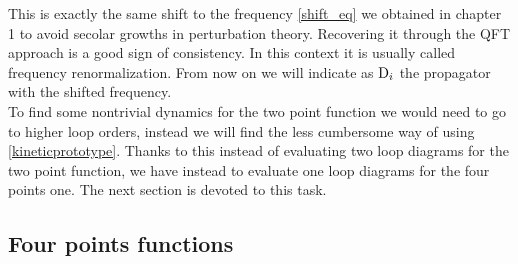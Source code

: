 This is exactly the same shift to the frequency \eqref{shift_eq} we obtained in chapter 1 to avoid secolar growths in perturbation theory.
Recovering it through the QFT approach is a good sign of consistency. In this context it is usually called frequency renormalization. From now on we will indicate
as $\mathrm{D}_i$ the propagator with the shifted frequency.\\  
To find some nontrivial dynamics for the two point function we would need to go to higher loop orders, instead we will find the less cumbersome way of using 
\eqref{kineticprototype}. Thanks to this instead of evaluating two loop diagrams for the two point function, we have instead to evaluate one loop diagrams for the 
four points one. The next section is devoted to this task.\\  
\subsection{Four points functions}

